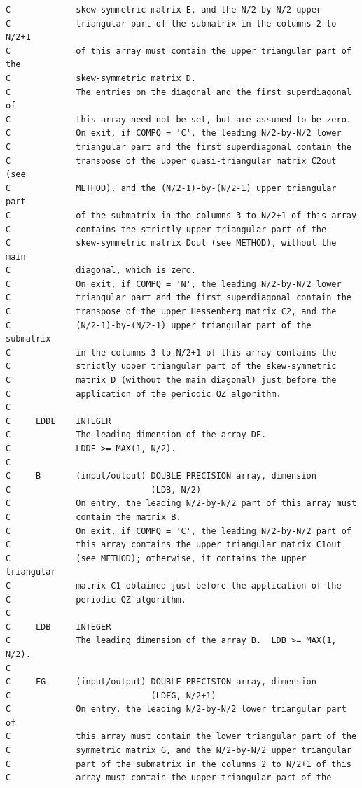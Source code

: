 \documentclass[a4paper,10pt]{article}
\begin{document}
\begin{verbatim}
C             skew-symmetric matrix E, and the N/2-by-N/2 upper
C             triangular part of the submatrix in the columns 2 to N/2+1
C             of this array must contain the upper triangular part of the
C             skew-symmetric matrix D.
C             The entries on the diagonal and the first superdiagonal of
C             this array need not be set, but are assumed to be zero.
C             On exit, if COMPQ = 'C', the leading N/2-by-N/2 lower
C             triangular part and the first superdiagonal contain the
C             transpose of the upper quasi-triangular matrix C2out (see
C             METHOD), and the (N/2-1)-by-(N/2-1) upper triangular part
C             of the submatrix in the columns 3 to N/2+1 of this array
C             contains the strictly upper triangular part of the
C             skew-symmetric matrix Dout (see METHOD), without the main
C             diagonal, which is zero.
C             On exit, if COMPQ = 'N', the leading N/2-by-N/2 lower
C             triangular part and the first superdiagonal contain the
C             transpose of the upper Hessenberg matrix C2, and the
C             (N/2-1)-by-(N/2-1) upper triangular part of the submatrix
C             in the columns 3 to N/2+1 of this array contains the
C             strictly upper triangular part of the skew-symmetric
C             matrix D (without the main diagonal) just before the
C             application of the periodic QZ algorithm.
C
C     LDDE    INTEGER
C             The leading dimension of the array DE.
C             LDDE >= MAX(1, N/2).
C
C     B       (input/output) DOUBLE PRECISION array, dimension
C                            (LDB, N/2)
C             On entry, the leading N/2-by-N/2 part of this array must
C             contain the matrix B.
C             On exit, if COMPQ = 'C', the leading N/2-by-N/2 part of
C             this array contains the upper triangular matrix C1out
C             (see METHOD); otherwise, it contains the upper triangular
C             matrix C1 obtained just before the application of the
C             periodic QZ algorithm.
C
C     LDB     INTEGER
C             The leading dimension of the array B.  LDB >= MAX(1, N/2).
C
C     FG      (input/output) DOUBLE PRECISION array, dimension
C                            (LDFG, N/2+1)
C             On entry, the leading N/2-by-N/2 lower triangular part of
C             this array must contain the lower triangular part of the
C             symmetric matrix G, and the N/2-by-N/2 upper triangular
C             part of the submatrix in the columns 2 to N/2+1 of this
C             array must contain the upper triangular part of the

\end{verbatim}
\end{document}

